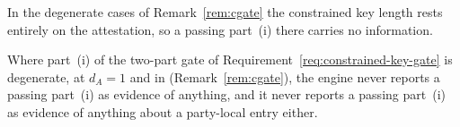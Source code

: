 
In the degenerate cases of Remark~\ref{rem:cgate} the constrained key length
rests entirely on the attestation, so a passing part~(i) there carries no
information.

\begin{requirement}\label{req:degenerate-gate-report}
Where part~(i) of the two-part gate of
Requirement~\ref{req:constrained-key-gate} is degenerate, at $d_A=1$ and in
 (Remark~\ref{rem:cgate}), the engine never
reports a passing part~(i) as evidence of anything, and it never reports a
passing part~(i) as evidence of anything about a party-local entry either.
\end{requirement}
